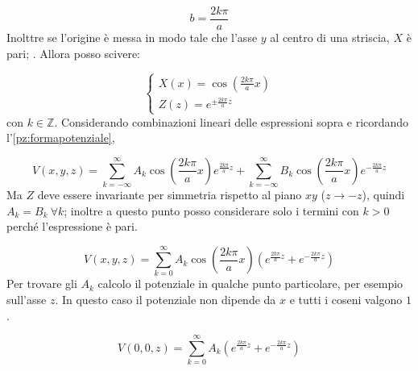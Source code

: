 \documentclass[../main.tex]{subfiles}
\begin{document}
\begin{equation}
  b=\frac{2k \pi}{a}
\end{equation}
Inolttre se l'origine \`e messa in modo tale che l'asse $y$ al centro di una striscia, $X$ \`e pari; . Allora posso scivere:

\begin{equation}
  \left\{
    \begin{aligned}
      X(x)=\cos \left(\frac{2 k \pi}{a}x \right) \\
      Z(z)=e^{\pm \frac{2 k \pi}{a}z}
    \end{aligned}
  \right.
\end{equation}
con $k\in \mathbb Z$. Considerando combinazioni lineari delle espressioni sopra e ricordando l'\cref{pz:formapotenziale},

\begin{equation}
  V(x,y,z)=\sum_{k=-\infty}^\infty A_k \cos \left(\frac{2 k \pi}{a}x \right) e^{\frac{2 k \pi}{a} z } + \sum_{k=-\infty}^\infty B_k \cos \left(\frac{2 k \pi}{a}x \right) e^{- \frac{2 k \pi}{a} z }
\end{equation}
Ma $Z$ deve essere invariante per simmetria rispetto al piano $xy$ ($z \to -z$), quindi $A_k=B_k \ \forall k$; %
inoltre a questo punto posso considerare solo i termini con $k>0$ perch\'e l'espressione \`e pari.

\begin{equation}
  V(x,y,z)=\sum_{k=0}^\infty A_k \cos \left(\frac{2 k \pi}{a}x \right) \left(e^{\frac{2 k \pi}{a} z } + e^{- \frac{2 k \pi}{a} z } \right)
\end{equation}
Per trovare gli $A_k$ calcolo il potenziale in qualche punto particolare, per esempio sull'asse $z$.
In questo caso il potenziale non dipende da $x$ e tutti i coseni valgono $1$.

\begin{equation}
  V(0,0,z)=\sum_{k=0}^\infty A_k \left( e^{\frac{2 k \pi}{a} z } + e^{- \frac{2 k \pi}{a} z } \right)
\end{equation}
\end{document}
